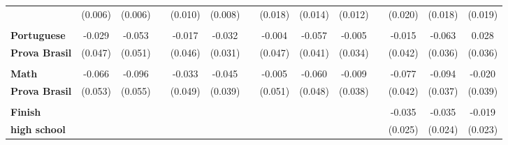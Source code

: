 \begin{landscape}
\begin{table}[ht]
\begin{threeparttable}
\begin{tabular}{lccccccccccccc}
           &    (0.006) &    (0.006) &            &    (0.010) &    (0.008) &            &    (0.018) &    (0.014) &    (0.012) &            &    (0.020) &    (0.018) &    (0.019) \\

           &            &            &            &            &            &            &            &            &            &            &            &            &            \\

{\bf Portuguese} &     -0.029 &     -0.053 &            &     -0.017 &     -0.032 &            &     -0.004 &     -0.057 &     -0.005 &            &     -0.015 &    -0.063 &      0.028 \\

{\bf Prova Brasil} &    (0.047) &    (0.051) &            &    (0.046) &    (0.031) &            &    (0.047) &    (0.041) &    (0.034) &            &    (0.042) &    (0.036) &    (0.036) \\

           &            &            &            &            &            &            &            &            &            &            &            &            &            \\

{\bf Math} &     -0.066 &    -0.096 &            &     -0.033 &     -0.045 &            &     -0.005 &     -0.060 &     -0.009 &            &    -0.077 &   -0.094 &     -0.020 \\

{\bf Prova Brasil} &     (0.053) &     (0.055) &            &    (0.049) &    (0.039) &            &    (0.051) &    (0.048) &    (0.038) &            &    (0.042) &    (0.037) &    (0.039) \\

           &            &            &            &            &            &            &            &            &            &            &            &            &            \\

{\bf Finish} &            &            &            &            &            &            &            &            &            &            &     -0.035 &     -0.035 &     -0.019 \\

{\bf high school} &            &            &            &            &            &            &            &            &            &            &    (0.025) &    (0.024) &    (0.023) \\


\end{tabular}
\end{threeparttable}
\end{table}
\end{landscape}
